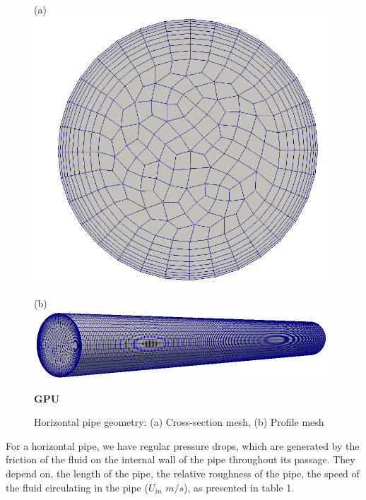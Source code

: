 \documentclass[11pt]{report}
\begin{document}
 \begin{minipage}[t]{0.35\textwidth}
 \begin{figure}[ht!]
 \begin{center}
 (a)\includegraphics[scale =0.09]{figs/section.png}
 \end{center}
 \end{figure}
 \begin{minipage}[t]{0.5\textwidth}
 \begin{figure}[ht!]
 (b)\includegraphics[scale = 0.25]{figs/HP-2.png}
 \end{figure}
\begin{figure}[ht!]
 {\Large\bf GPU}
 \caption{Horizontal pipe geometry: (a) Cross-section mesh, (b) Profile mesh }
 \label{horiz}
 \end{figure}
 For a horizontal pipe, we have regular pressure drops, which are generated by the friction of the fluid on the internal wall of the pipe throughout its passage. 
 They depend on, the length of the pipe, the relative roughness of the pipe, the speed of the fluid circulating in the pipe ($U_{in}$ $m/s$), as presented in table 1. 

\end{minipage}
\end{minipage}
\end{document}
